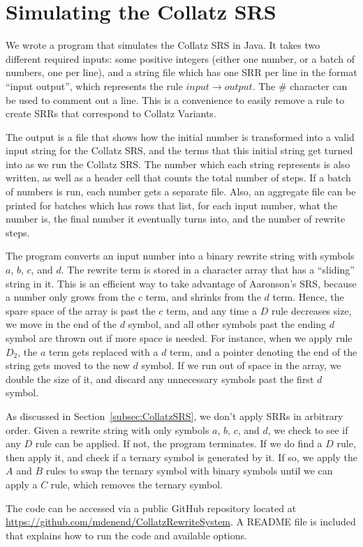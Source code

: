 \section{Simulating the Collatz SRS} \label{subsec:rewritecomp}
We wrote a program that simulates the Collatz SRS in Java. It takes two different required inputs: some positive integers (either one number, or a batch of numbers, one per line), and a string file which has one SRR per line in the format ``input output'', which represents the rule $input \rightarrow output$. The \# character can be used to comment out a line. This is a convenience to easily remove a rule to create SRRs that correspond to Collatz Variants. \par
The output is a file that shows how the initial number is transformed into a valid input string for the Collatz SRS, and the terms that this initial string get turned into as we run the Collatz SRS. The number which each string represents is also written, as well as a header cell that counts the total number of steps. If a batch of numbers is run, each number gets a separate file. Also, an aggregate file can be printed for batches which has rows that list, for each input number, what the number is, the final number it eventually turns into, and the number of rewrite steps. \par
The program converts an input number into a binary rewrite string with symbols $a$, $b$, $c$, and $d$. The rewrite term is stored in a character array that has a ``sliding'' string in it. This is an efficient way to take advantage of Aaronson's SRS, because a number only grows from the $c$ term, and shrinks from the $d$ term. Hence, the spare space of the array is past the $c$ term, and any time a $D$ rule decreases size, we move in the end of the $d$ symbol, and all other symbols past the ending $d$ symbol are thrown out if more space is needed. For instance, when we apply rule $D_2$, the $a$ term gets replaced with a $d$ term, and a pointer denoting the end of the string gets moved to the new $d$ symbol. If we run out of space in the array, we double the size of it, and discard any unnecessary symbols past the first $d$ symbol. \par
As discussed in Section~\ref{subsec:CollatzSRS}, we don't apply SRRs in arbitrary order. Given a rewrite string with only symbols $a$, $b$, $c$, and $d$, we check to see if any $D$ rule can be applied. If not, the program terminates. If we do find a $D$ rule, then apply it, and check if a ternary symbol is generated by it. If so, we apply the $A$ and $B$ rules to swap the ternary symbol with binary symbols until we can apply a $C$ rule, which removes the ternary symbol. \par
The code can be accessed via a public GitHub repository located at \url{https://github.com/mdenend/CollatzRewriteSystem}. A README file is included that explains how to run the code and available options.


